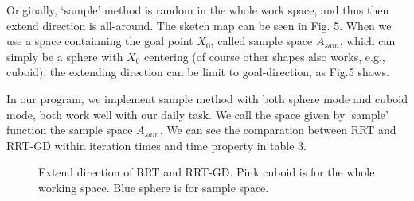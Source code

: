 \documentclass[letterpaper, 10 pt, conference]{ieeeconf}  %
\begin{document}
Originally, `sample' method is random in the whole work space, and thus then extend direction is all-around. The sketch map can be seen in Fig. 5. When we use a space containning the goal point $X_{0}$, called sample space $A_{sam}$, which can simply be a sphere with $X_{0}$ centering (of course other shapes also works, e.g., cuboid), the extending direction can be limit to goal-direction, as Fig.5 shows. 

In our program, we implement sample method with both sphere mode and cuboid mode, both work well with our daily task. We call the space given by `sample' function the sample space $A_{sam}$. We can see the comparation between RRT and RRT-GD within iteration times and time property in table 3.

\begin{figure}[thpb]
      \centering
      \caption{Extend direction of RRT and RRT-GD. Pink cuboid is for the whole working space. Blue sphere is for sample space. }
      \label{figurelabe5}
\end{figure}
\end{document}
